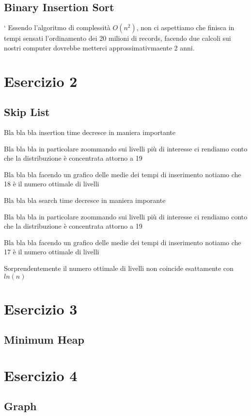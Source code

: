 \documentclass[12pt, letterpaper]{report}
\begin{document}
\section{Binary Insertion Sort}`
Essendo l'algoritmo di complessità $O(n^2)$, non ci aspettiamo che finisca in tempi
sensati l'ordinamento dei 20 milioni di records, facendo due calcoli sui nostri computer
dovrebbe metterci approssimativmaente 2 anni.


\chapter*{Esercizio 2}

\section{Skip List}

Bla bla bla insertion time decresce in maniera importante


Bla bla bla in particolare zoommando sui livelli più di interesse ci rendiamo conto
che la distribuzione è concentrata attorno a 19


Bla bla bla facendo un grafico delle medie dei tempi di inserimento notiamo che 18
è il numero ottimale di livelli


Bla bla bla search time decresce in maniera imporante


Bla bla bla in particolare zoommando sui livelli più di interesse ci rendiamo conto
che la distribuzione è concentrata attorno a 19


Bla bla bla facendo un grafico delle medie dei tempi di inserimento notiamo che 17
è il numero ottimale di livelli


Sorprendentemente il numero ottimale di livelli non coincide esattamente con $ln(n)$

\chapter*{Esercizio 3}
\section{Minimum Heap}

\chapter*{Esercizio 4}
\section{Graph}
\end{document}
